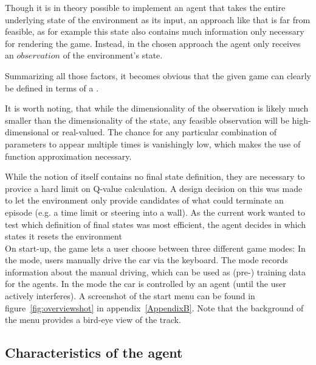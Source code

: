 Though it is in theory possible to implement an agent that takes the entire underlying state of the environment as its input, an approach like that is far from feasible, as for example this state also contains much information only necessary for rendering the game. Instead, in the chosen approach the agent only receives an $observation$ of the environment's state. 

Summarizing all those factors, it becomes obvious that the given game can clearly be defined in terms of a .

It is worth noting, that while the dimensionality of the observation is likely much smaller than the dimensionality of the state, any feasible observation will be high-dimensional or real-valued. The chance for any particular combination of parameters to appear multiple times is vanishingly low, which makes the use of function approximation necessary.

While the notion of  itself contains no final state definition, they are necessary to provice a hard limit on Q-value calculation. A design decision on this was made to let the environment only provide candidates of what could terminate an episode (e.g. a time limit or steering into a wall). As the current work wanted to test which definition of final states was most efficient, the agent decides in which states it resets the environment \\

On start-up, the game lets a user choose between three different game modes: In the  mode, users manually drive the car via the keyboard. The  mode records information about the manual driving, which can be used as (pre-) training data for the agents. In the  mode the car is controlled by an agent (until the user actively interferes). A screenshot of the start menu can be found in figure~\ref{fig:overviewshot} in appendix~\ref{AppendixB}. Note that the background of the menu provides a bird-eye view of the track.

\subsection{Characteristics of the agent}
\label{ch:agentchars}

